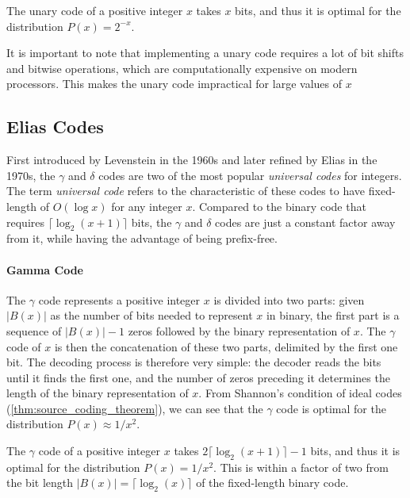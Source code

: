 \begin{theorem}
    The unary code of a positive integer $x$ takes $x$ bits, and thus it is optimal for the distribution $P(x)=2^{-x}$.
\end{theorem}

\noindent It is important to note that implementing a unary code requires a lot of bit shifts and bitwise operations, which are computationally expensive on modern processors. This makes the unary code impractical for large values of $x$


\subsection{Elias Codes}
First introduced by Levenstein in the 1960s and later refined by Elias \cite{Elias1975} in the 1970s, the $\gamma$ and $\delta$ codes are two of the most popular \emph{universal codes} for integers. The term \emph{universal code} refers to the characteristic of these codes to have fixed-length of $O(\log x)$ for any integer $x$. Compared to the binary code that requires $\lceil\log_2(x+1)\rceil$ bits, the $\gamma$ and $\delta$ codes are just a constant factor away from it, while having the advantage of being prefix-free.

\paragraph{Gamma Code} The $\gamma$ code represents a positive integer $x$ is divided into two parts: given $|B(x)|$ as the number of bits needed to represent $x$ in binary, the first part is a sequence of $|B(x)| - 1$ zeros followed by the binary representation of $x$. The $\gamma$ code of $x$ is then the concatenation of these two parts, delimited by the first one bit. The decoding process is therefore very simple: the decoder reads the bits until it finds the first one, and the number of zeros preceding it determines the length of the binary representation of $x$. From Shannon's condition of ideal codes (\autoref{thm:source_coding_theorem}), we can see that the $\gamma$ code is optimal for the distribution $P(x)\approx 1/x^2$. \cite{ferragina2023pearls}
\vspace{0.4cm}

\begin{theorem}
    The $\gamma$ code of a positive integer $x$ takes $2\lceil\log_2(x+1)\rceil-1$ bits, and thus it is optimal for the distribution $P(x)=1/x^2$. This is within a factor of two from the bit length $|B(x)| = \lceil\log_2(x)\rceil$ of the fixed-length binary code.
\end{theorem}

